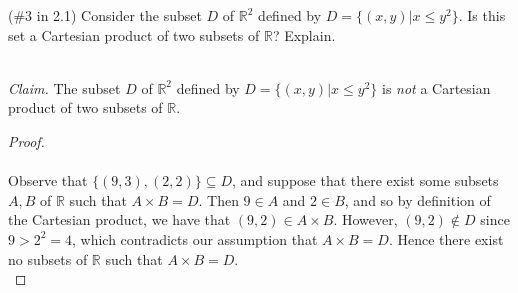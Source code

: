 (\#3 in 2.1) Consider the subset $D$ of $\mathbb{R}^2$ defined by
$D=\{(x,y)|x\leq y^2\}$. Is this set a Cartesian product of two subsets of
$\mathbb{R}$? Explain.
    
\ \\
\emph{Claim.} The subset $D$ of $\mathbb{R}^2$ defined by
$D=\{(x,y)|x\leq y^2\}$ is \emph{not} a Cartesian product of two subsets of
$\mathbb{R}$.

\begin{proof}\ \\\\
    Observe that $\{(9, 3), (2, 2)\} \subseteq D$, and suppose that there exist
    some subsets $A, B$ of $\mathbb{R}$ such that $A \times B = D$. Then 
    $9 \in A$ and $2 \in B$, and so by definition of the Cartesian product, 
    we have that $(9, 2) \in A \times B$. However, $(9, 2) \notin D$ since
    $9 > 2^2 = 4$, which contradicts our assumption that $A \times B = D$. Hence
    there exist no subsets of $\mathbb{R}$ such that $A \times B = D$. \\
\end{proof}